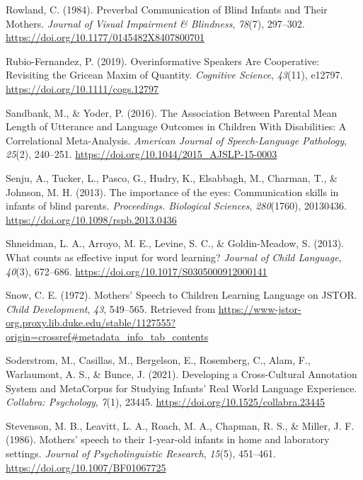 \documentclass[
  man]{apa6}
\newlength{\cslhangindent}
\newlength{\cslentryspacingunit} %
\newenvironment{CSLReferences}[2] %
 {%
  \setlength{\parindent}{0pt}
  \ifodd #1
  \let\oldpar\par
  \def\par{\hangindent=\cslhangindent\oldpar}
  \fi
  \setlength{\parskip}{#2\cslentryspacingunit}
 }%
 {}
\begin{document}
\begin{CSLReferences}{1}{0}
\leavevmode{}%
Rowland, C. (1984). Preverbal {Communication} of {Blind} {Infants} and {Their} {Mothers}. \emph{Journal of Visual Impairment \& Blindness}, \emph{78}(7), 297--302. \url{https://doi.org/10.1177/0145482X8407800701}

\leavevmode{}%
Rubio-Fernandez, P. (2019). Overinformative {Speakers} {Are} {Cooperative}: {Revisiting} the {Gricean} {Maxim} of {Quantity}. \emph{Cognitive Science}, \emph{43}(11), e12797. \url{https://doi.org/10.1111/cogs.12797}

\leavevmode{}%
Sandbank, M., \& Yoder, P. (2016). The {Association} {Between} {Parental} {Mean} {Length} of {Utterance} and {Language} {Outcomes} in {Children} {With} {Disabilities}: {A} {Correlational} {Meta}-{Analysis}. \emph{American Journal of Speech-Language Pathology}, \emph{25}(2), 240--251. \url{https://doi.org/10.1044/2015_AJSLP-15-0003}

\leavevmode{}%
Senju, A., Tucker, L., Pasco, G., Hudry, K., Elsabbagh, M., Charman, T., \& Johnson, M. H. (2013). The importance of the eyes: Communication skills in infants of blind parents. \emph{Proceedings. Biological Sciences}, \emph{280}(1760), 20130436. \url{https://doi.org/10.1098/rspb.2013.0436}

\leavevmode{}%
Shneidman, L. A., Arroyo, M. E., Levine, S. C., \& Goldin-Meadow, S. (2013). What counts as effective input for word learning? \emph{Journal of Child Language}, \emph{40}(3), 672--686. \url{https://doi.org/10.1017/S0305000912000141}

\leavevmode{}%
Snow, C. E. (1972). Mothers' {Speech} to {Children} {Learning} {Language} on {JSTOR}. \emph{Child Development}, \emph{43}, 549--565. Retrieved from \url{https://www-jstor-org.proxy.lib.duke.edu/stable/1127555?origin=crossref\#metadata_info_tab_contents}

\leavevmode{}%
Soderstrom, M., Casillas, M., Bergelson, E., Rosemberg, C., Alam, F., Warlaumont, A. S., \& Bunce, J. (2021). Developing a {Cross}-{Cultural} {Annotation} {System} and {MetaCorpus} for {Studying} {Infants}' {Real} {World} {Language} {Experience}. \emph{Collabra: Psychology}, \emph{7}(1), 23445. \url{https://doi.org/10.1525/collabra.23445}

\leavevmode{}%
Stevenson, M. B., Leavitt, L. A., Roach, M. A., Chapman, R. S., \& Miller, J. F. (1986). Mothers' speech to their 1-year-old infants in home and laboratory settings. \emph{Journal of Psycholinguistic Research}, \emph{15}(5), 451--461. \url{https://doi.org/10.1007/BF01067725}


\end{CSLReferences}
\end{document}
